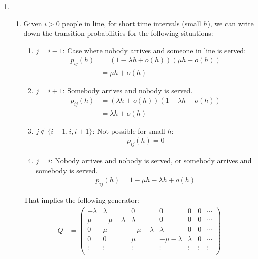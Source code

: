 \documentclass[12pt]{article}
\theoremstyle{plain}
\theoremstyle{definition}
\theoremstyle{remark}
\begin{document}
\begin{enumerate}
  \item %
    \begin{enumerate}
      \item %
        Given $i>0$ people in line, for short time intervals (small
        $h$), we can write down the transition probabilities for the
        following situations:
        \begin{enumerate}
          \item $j = i-1$: Case where nobody arrives and someone in line
            is served:
            \begin{align*}
              p_{ij}(h)
                &= (1-\lambda h + o(h)) (\mu h + o(h)) \\
                &= \mu h + o(h)
            \end{align*}
          \item $j = i+1$: Somebody arrives and nobody is served.
            \begin{align*}
              p_{ij}(h)
                &= (\lambda h + o(h))(1-\lambda h + o(h)) \\
                &= \lambda h + o(h)
            \end{align*}
          \item $j \not\in\{i-1, i, i+1\}$: Not possible for small $h$:
            \begin{align*}
              p_{ij}(h) = 0
            \end{align*}
          \item $j = i$: Nobody arrives and nobody is served, or somebody
            arrives and somebody is served.
            \begin{align*}
              p_{ij}(h) = 1 - \mu h - \lambda h + o(h)
            \end{align*}
        \end{enumerate}
        That implies the following generator:
        \begin{align*}
          Q &=
          \begin{pmatrix}
            -\lambda & \lambda & 0 & 0 & 0 & 0 & \cdots \\
            \mu & -\mu-\lambda & \lambda & 0 & 0 & 0 & \cdots\\
            0 & \mu & -\mu-\lambda & \lambda & 0 & 0 & \cdots \\
            0 & 0 & \mu & -\mu-\lambda & \lambda & 0 &  \cdots \\
            \vdots & \vdots  & \vdots & \vdots & \vdots & \vdots & \vdots \\
          \end{pmatrix}
        \end{align*}


\end{enumerate}
\end{enumerate}
\end{document}
